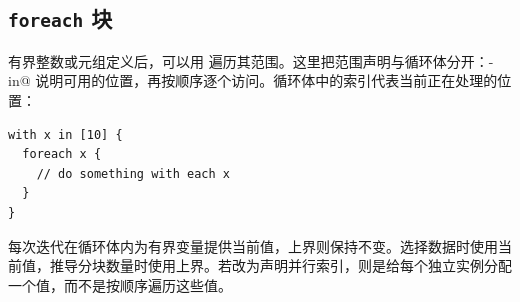 \subsection*{\texttt{foreach} 块}

有界整数或元组定义后，可以用 \co@foreach@ 遍历其范围。这里把范围声明与循环体分开：\co@with-in@ 说明可用的位置，\co@foreach@ 再按顺序逐个访问。循环体中的索引代表当前正在处理的位置：

\begin{lstlisting}[language=croqtile,caption={foreach 块}]
with x in [10] {
  foreach x {
    // do something with each x
  }
}
\end{lstlisting}

每次迭代在循环体内为有界变量提供当前值，上界则保持不变。选择数据时使用当前值，推导分块数量时使用上界。若改为声明并行索引，则是给每个独立实例分配一个值，而不是按顺序遍历这些值。
